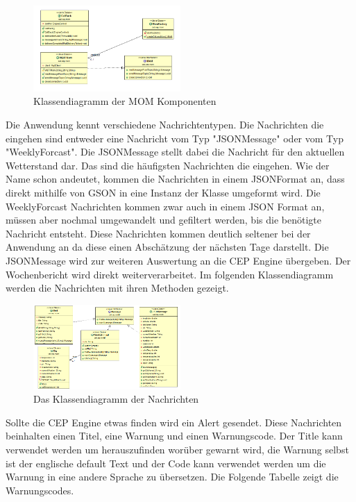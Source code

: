 \begin{figure}[htbp]
	\centering
	\includegraphics[width=0.5\textwidth]{Bilder/MoMKomponents.png}
	\caption{Klassendiagramm der MOM Komponenten}
	\label{img:MoMDiagramm}
\end{figure} 
Die Anwendung kennt verschiedene Nachrichtentypen. Die Nachrichten die eingehen sind entweder eine Nachricht vom Typ "JSONMessage" oder vom Typ "WeeklyForcast". Die JSONMessage stellt dabei die Nachricht für den aktuellen Wetterstand dar. Das sind die häufigsten Nachrichten die eingehen. Wie der Name schon andeutet, kommen die Nachrichten in einem JSONFormat an, dass direkt mithilfe von GSON in eine Instanz der Klasse umgeformt wird. Die WeeklyForcast Nachrichten kommen zwar auch in einem JSON Format an, müssen aber nochmal umgewandelt und gefiltert werden, bis die benötigte Nachricht entsteht. Diese Nachrichten kommen deutlich seltener bei der Anwendung an da diese einen Abschätzung der nächsten Tage darstellt. Die JSONMessage wird zur weiteren Auswertung an die CEP Engine übergeben. Der Wochenbericht wird direkt weiterverarbeitet. Im folgenden Klassendiagramm werden die Nachrichten mit ihren Methoden gezeigt. 
\begin{figure}[htbp]
	\centering
	\includegraphics[width=0.5\textwidth]{Bilder/News.png}
	\caption{Das Klassendiagramm der Nachrichten}
	\label{img:eventDiagramm}
\end{figure} 
Sollte die CEP Engine etwas finden wird ein Alert gesendet. Diese Nachrichten beinhalten einen Titel, eine Warnung und einen Warnungscode. Der Title kann verwendet werden um herauszufinden worüber gewarnt wird, die Warnung selbst ist der englische default Text und der Code kann verwendet werden um die Warnung in eine andere Sprache zu übersetzen.  Die Folgende Tabelle zeigt die Warnungscodes. 
